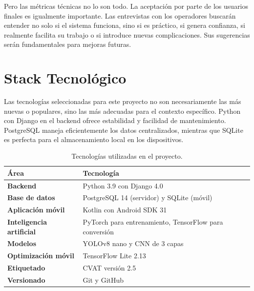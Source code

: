 Pero las métricas técnicas no lo son todo. La aceptación por parte de los usuarios finales es igualmente importante. Las entrevistas con los operadores buscarán entender no solo si el sistema funciona, sino si es práctico, si genera confianza, si realmente facilita su trabajo o si introduce nuevas complicaciones. Sus sugerencias serán fundamentales para mejoras futuras.

\section{Stack Tecnológico}
\label{sec:tech_stack}

Las tecnologías seleccionadas para este proyecto no son necesariamente las más nuevas o populares, sino las más adecuadas para el contexto específico. Python con Django en el backend ofrece estabilidad y facilidad de mantenimiento. PostgreSQL maneja eficientemente los datos centralizados, mientras que SQLite es perfecta para el almacenamiento local en los dispositivos.

\begin{table}[H]
    \caption{Tecnologías utilizadas en el proyecto.}
    \label{tab:tech_stack}
    \begin{singlespace} 
    \begin{tabularx}{\textwidth}{>{\bfseries}l >{\raggedright\arraybackslash}X}
        \toprule
        \textbf{Área} & \textbf{Tecnología} \\
        \midrule
        Backend & Python 3.9 con Django 4.0 \\
        \addlinespace
        Base de datos & PostgreSQL 14 (servidor) y SQLite (móvil) \\
        \addlinespace
        Aplicación móvil & Kotlin con Android SDK 31 \\
        \addlinespace
        Inteligencia artificial & PyTorch para entrenamiento, TensorFlow para conversión \\
        \addlinespace
        Modelos & YOLOv8 nano y CNN de 3 capas \\
        \addlinespace
        Optimización móvil & TensorFlow Lite 2.13 \\
        \addlinespace
        Etiquetado & CVAT versión 2.5 \\
        \addlinespace
        Versionado & Git y GitHub \\
        \bottomrule
    \end{tabularx}
    \end{singlespace}
\end{table}

